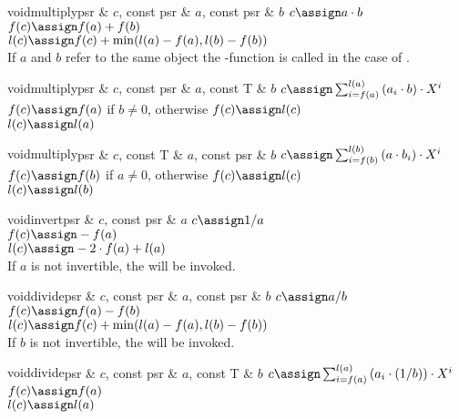 \begin{fcode}{void}{multiply}{psr & $c$, const psr & $a$, const psr & $b$}
  $c \assign a \cdot b$ \\
  $f(c) \assign f(a) + f(b)$ \\
  $l(c) \assign f(c) + \min(l(a)-f(a),l(b)-f(b))$ \\
  If $a$ and $b$ refer to the same object the -function is called in the
  case of .
\end{fcode}

\begin{fcode}{void}{multiply}{psr & $c$, const psr & $a$, const T & $b$}
  $c \assign \sum_{i=f(a)}^{l(a)} \left( a_i \cdot b \right) \cdot X^i$ \\
  $f(c) \assign f(a)$ if $b \neq 0$, otherwise $f(c) \assign l(c)$ \\
  $l(c) \assign l(a)$
\end{fcode}

\begin{fcode}{void}{multiply}{psr & $c$, const T & $a$, const psr & $b$}
  $c \assign \sum_{i=f(b)}^{l(b)} \left( a \cdot b_i \right) \cdot X^i$ \\
  $f(c) \assign f(b)$ if $a \neq 0$, otherwise $f(c) \assign l(c)$ \\
  $l(c) \assign l(b)$
\end{fcode}

\begin{fcode}{void}{invert}{psr & $c$, const psr & $a$}
  $c \assign 1/a$ \\
  $f(c) \assign - f(a)$ \\
  $l(c) \assign - 2 \cdot f(a) + l(a)$ \\
  If $a$ is not invertible, the \LEH will be invoked.
\end{fcode}

\begin{fcode}{void}{divide}{psr & $c$, const psr & $a$, const psr & $b$}
  $c \assign a / b$ \\
  $f(c) \assign f(a) - f(b)$ \\
  $l(c) \assign f(c) + \min(l(a)-f(a),l(b)-f(b))$ \\
  If $b$ is not invertible, the \LEH will be invoked.
\end{fcode}

\begin{fcode}{void}{divide}{psr & $c$, const psr & $a$, const T & $b$}
  $c \assign \sum_{i=f(a)}^{l(a)} \left( a_i \cdot (1/b) \right) \cdot X^i$ \\
  $f(c) \assign f(a)$ \\
  $l(c) \assign l(a)$
\end{fcode}

